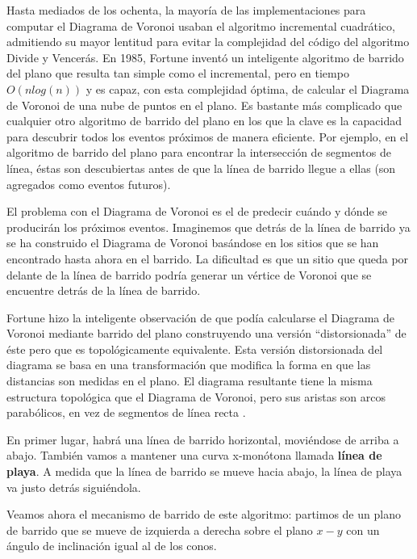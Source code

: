 Hasta mediados de los ochenta, la mayoría de las implementaciones para computar el Diagrama de Voronoi usaban el algoritmo incremental cuadrático, admitiendo su mayor lentitud para evitar la complejidad del código del algoritmo Divide y Vencerás. En 1985, Fortune inventó un inteligente algoritmo de barrido del plano que resulta tan simple como el incremental, pero en tiempo $O(nlog(n))$ y es capaz, con esta complejidad óptima, de calcular el Diagrama de Voronoi de una nube de puntos en el plano.
Es bastante más complicado que cualquier otro algoritmo de barrido del plano en los que la clave es la capacidad para descubrir todos los eventos próximos de manera eficiente. Por ejemplo, en el algoritmo de barrido del plano para encontrar la intersección de segmentos de línea, éstas son descubiertas antes de que la línea de barrido llegue a ellas (son agregados como eventos futuros).
\vspace{0.3cm}

El problema con el Diagrama de Voronoi es el de predecir cuándo y dónde se producirán los próximos eventos. Imaginemos que detrás de la línea de barrido ya se ha construido el Diagrama de Voronoi basándose en los sitios que se han encontrado hasta ahora en el barrido. La dificultad es que un sitio que queda por delante de la línea de barrido podría generar un vértice de Voronoi que se encuentre detrás de la línea de barrido.
\vspace{0.3cm}

Fortune hizo la inteligente observación de que podía calcularse el Diagrama de Voronoi mediante barrido del plano construyendo una versión “distorsionada” de éste pero que es topológicamente equivalente. Esta versión distorsionada del diagrama se basa en una transformación que modifica la forma en que las distancias son medidas en el plano. El diagrama resultante tiene la misma estructura topológica que el Diagrama de Voronoi, pero sus aristas son arcos parabólicos, en vez de segmentos de línea recta \cite{alfortune}.
\vspace{0.3cm}

En primer lugar, habrá una línea de barrido horizontal, moviéndose de arriba a abajo. También vamos a mantener una curva x-monótona llamada \textbf{línea de playa}. A medida que la línea de barrido se mueve hacia abajo, la línea de playa va justo detrás siguiéndola.
\vspace{0.3cm}

Veamos ahora el mecanismo de barrido de este algoritmo: partimos de un plano de barrido que se mueve de izquierda a derecha sobre el plano $x-y$ con un ángulo de inclinación igual al de los conos.
\vspace{0.3cm}

